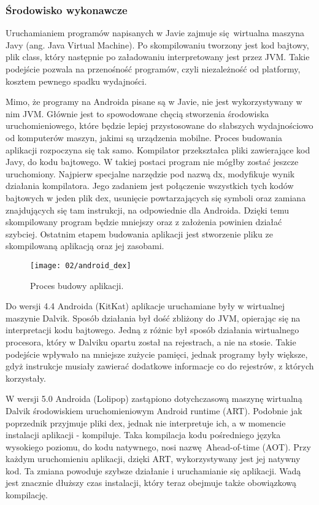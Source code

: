 \subsubsection*{Środowisko wykonawcze}
Uruchamianiem programów napisanych w Javie zajmuje się wirtualna maszyna Javy (ang. Java Virtual Machine). Po skompilowaniu tworzony jest kod bajtowy, plik class, który następnie po załadowaniu interpretowany jest przez JVM. Takie podejście pozwala na przenośność programów, czyli niezależność od platformy, kosztem pewnego spadku wydajności.

Mimo, że programy na Androida pisane są w Javie, nie jest wykorzystywany w nim JVM. Głównie jest to spowodowane chęcią stworzenia środowiska uruchomieniowego, które będzie lepiej przystosowane do słabszych wydajnościowo od komputerów maszyn, jakimi są urządzenia mobilne. Proces budowania aplikacji rozpoczyna się tak samo. Kompilator przekształca pliki zawierające kod Javy, do kodu bajtowego. W takiej postaci program nie mógłby zostać jeszcze uruchomiony. Najpierw specjalne narzędzie pod nazwą dx, modyfikuje wynik działania kompilatora. Jego zadaniem jest połączenie wszystkich tych kodów bajtowych w jeden plik dex, usunięcie powtarzających się symboli oraz zamiana znajdujących się tam instrukcji, na odpowiednie dla Androida. Dzięki temu skompilowany program będzie mniejszy oraz z założenia powinien działać szybciej. Ostatnim etapem budowania aplikacji jest stworzenie pliku ze skompilowaną aplikacją oraz jej zasobami.

\begin{figure}[h]
	\begin{center}
		\texttt{[image: 02/android\_dex]}
	\end{center}
	\caption{Proces budowy aplikacji.}
	\vspace{-0.5cm}
\end{figure}

Do wersji 4.4 Androida (KitKat) aplikacje uruchamiane były w wirtualnej maszynie Dalvik. Sposób działania był dość zbliżony do JVM, opierając się na interpretacji kodu bajtowego. Jedną z różnic był sposób działania wirtualnego procesora, który w Dalviku opartu został na rejestrach, a nie na stosie. Takie podejście wpływało na mniejsze zużycie pamięci, jednak programy były większe, gdyż instrukcje musiały zawierać dodatkowe informacje co do rejestrów, z których korzystały.

W wersji 5.0 Androida (Lolipop) zastąpiono dotychczasową maszynę wirtualną Dalvik środowiskiem uruchomieniowym Android runtime (ART). Podobnie jak poprzednik przyjmuje pliki dex, jednak nie interpretuje ich, a w momencie instalacji aplikacji - kompiluje. Taka kompilacja kodu pośredniego języka wysokiego poziomu, do kodu natywnego, nosi nazwę Ahead-of-time (AOT). Przy każdym uruchomieniu aplikacji, dzięki ART, wykorzystywany jest jej natywny kod. Ta zmiana powoduje szybsze działanie i uruchamianie się aplikacji. Wadą jest znacznie dłuższy czas instalacji, który teraz obejmuje także obowiązkową kompilację.

